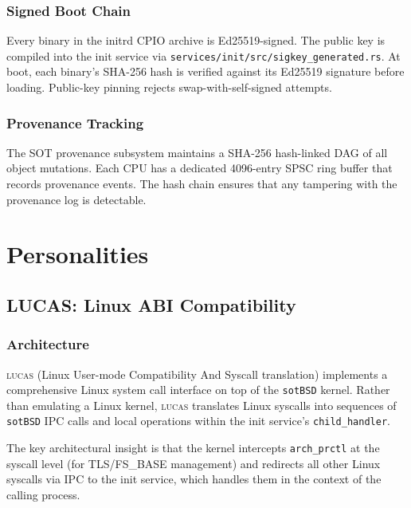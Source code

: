 \documentclass[11pt,a4paper,twoside]{report}
\theoremstyle{definition}
\newcommand{\sotBSD}{\texttt{sotBSD}}
\newcommand{\LUCAS}{\textsc{lucas}}
\newcommand{\file}[1]{\texttt{#1}}
\begin{document}
\section{Signed Boot Chain}

Every binary in the initrd CPIO archive is Ed25519-signed. The public key
is compiled into the init service via
\file{services/init/src/sigkey\_generated.rs}. At boot, each binary's SHA-256
hash is verified against its Ed25519 signature before loading. Public-key
pinning rejects swap-with-self-signed attempts.

\section{Provenance Tracking}

The SOT provenance subsystem maintains a SHA-256 hash-linked DAG of all
object mutations. Each CPU has a dedicated 4096-entry SPSC ring buffer that
records provenance events. The hash chain ensures that any tampering with
the provenance log is detectable.


\part{Personalities}

\chapter{LUCAS: Linux ABI Compatibility}
\label{ch:lucas}

\section{Architecture}

\LUCAS{} (Linux User-mode Compatibility And Syscall translation) implements
a comprehensive Linux system call interface on top of the \sotBSD{} kernel.
Rather than emulating a Linux kernel, \LUCAS{} translates Linux syscalls
into sequences of \sotBSD{} IPC calls and local operations within the init
service's \texttt{child\_handler}.

The key architectural insight is that the kernel intercepts
\texttt{arch\_prctl} at the syscall level (for TLS/FS\_BASE management) and
redirects all other Linux syscalls via IPC to the init service, which
handles them in the context of the calling process.
\end{document}
